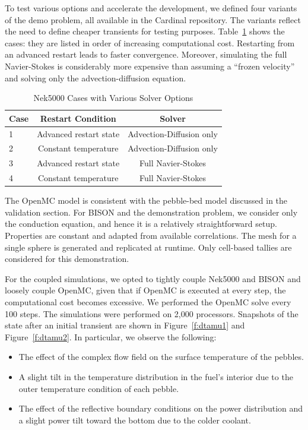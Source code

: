 To test various options and accelerate the development, we defined four
variants of the demo problem, all available in the Cardinal repository. The
variants reflect the need to define cheaper transients for testing purposes.
Table~\ref{tab:nek} shows the cases: they are listed in order of increasing
computational cost. Restarting from an advanced restart leads to faster
convergence. Moreover, simulating the full Navier-Stokes is considerably more
expensive than assuming a ``frozen velocity'' and solving only the
advection-diffusion equation.

\begin{table}
  \centering
  \begin{tabular}{|lcc|}
    \hline \hline
    Case & Restart Condition & Solver \\
    \hline
    1 & Advanced restart state & Advection-Diffusion only \\
    2 & Constant temperature   & Advection-Diffusion only \\
    3 & Advanced restart state & Full Navier-Stokes \\
    4 & Constant temperature   & Full Navier-Stokes \\
    \hline \hline
  \end{tabular}
  \caption{Nek5000 Cases with Various Solver Options}
  \label{tab:nek}
\end{table}

The OpenMC model is consistent with the pebble-bed model discussed in the validation section. For BISON and the demonstration problem, we consider only the conduction equation, and hence it is a relatively straightforward setup. Properties are constant and adapted from available correlations. The mesh for a single sphere is generated and replicated at runtime. Only cell-based tallies are considered for this demonstration.

For the coupled simulations, we opted to tightly couple Nek5000 and BISON and loosely couple OpenMC, given that if OpenMC is executed at every step, the computational cost becomes excessive. We performed the OpenMC solve every 100 steps. The simulations were performed on 2,000 processors. Snapshots of the state after an initial transient are shown in Figure~\ref{f:dtamu1} and Figure~\ref{f:dtamu2}. In particular, we observe the following:
\begin{itemize}
  \item The effect of the complex flow field on the surface temperature of the pebbles.
  \item A slight tilt in the temperature distribution in the fuel's interior due to the outer temperature condition of each pebble.
  \item The effect of the reflective boundary conditions on the power distribution and a slight power tilt toward the bottom due to the colder coolant.
\end{itemize}

